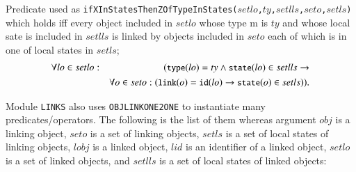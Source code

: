 \documentclass[12pt]{report}
\newcommand{\ra}{\rightarrow}
\newcommand{\mbstt}[1]{\mbox{\small{\tt {#1}}}}
\newcommand{\stt}[1]{{\small{\tt {#1}}}}
\begin{document}
\begin{itemize}
  Predicate used as
  \stt{ifXInStatesThenZOfTypeInStates($setlo$,$ty$,$setlls$,$seto$,$setls$)}
  which holds iff every object included in $setlo$ whose type
m  is $ty$ and whose local sate is included in $setlls$ is linked by
  objects included in $seto$ each of which is in one of local states
  in $setls$;
  \vspace{-0.3cm}
  \begin{eqnarray*}
    \forall lo\in setlo:&&(\mbstt{type}(lo)=ty\land\mbstt{state}(lo)\in setlls\ra\\
    &&\forall o\in seto: (\mbstt{link}(o)=\mbstt{id}(lo)\ra\mbstt{state}(o)\in setls)).
  \end{eqnarray*}
\end{itemize}

Module {\tt LINKS} also uses {\tt OBJLINKONE2ONE} to instantiate many
predicates/operators. The following is the list of them whereas argument
$obj$ is a linking object, $seto$ is a set of linking objects, $setls$
is a set of local states of linking objects, $lobj$ is a linked
object, $lid$ is an identifier of a linked object, $setlo$ is a set of
linked objects, and $setlls$ is a set of local states of linked
objects:
\end{document}
